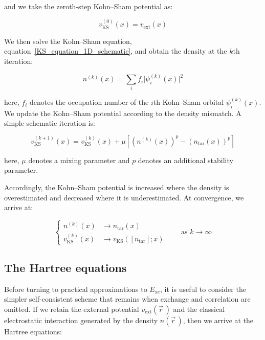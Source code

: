 and we take the zeroth-step Kohn--Sham potential as:

\begin{equation}
    v_\mathrm{KS}^{(0)}(x)=v_\mathrm{ext}(x)
\label{inverse_KS_initial_guess}
\end{equation}

We then solve the Kohn--Sham equation, equation~\eqref{KS_equation_1D_schematic}, and obtain the density at the $k$th iteration:

\begin{equation}
    n^{(k)}(x)=\sum_i f_i \lvert\psi_i^{(k)}(x)\rvert^2
\label{inverse_KS_density_from_kth_iteration}
\end{equation}

here, $f_i$ denotes the occupation number of the $i$th Kohn--Sham orbital $\psi_i^{(k)}(x)$.
We update the Kohn--Sham potential according to the density mismatch.
A simple schematic iteration is:

\begin{equation}
    v_\mathrm{KS}^{(k+1)}(x) = v_\mathrm{KS}^{(k)}(x)
    + \mu \left[\left(n^{(k)}(x)\right)^p - \left(n_\mathrm{tar}(x)\right)^p\right]
\label{inverse_KS_density_update}
\end{equation}

here, $\mu$ denotes a mixing parameter and $p$ denotes an additional stability parameter.

Accordingly, the Kohn--Sham potential is increased where the density is overestimated and decreased where it is underestimated.
At convergence, we arrive at:

\begin{equation}
\left\{
\begin{aligned}
    n^{(k)}(x)                &\rightarrow n_\mathrm{tar}(x)   \\
    v_\mathrm{KS}^{(k)}(x)    &\rightarrow v_\mathrm{KS}([n_\mathrm{tar}];x)
\end{aligned}\right.
\qquad
\text{as $k\rightarrow\infty$} 
\label{inverse_KS_fixed_point_condition}
\end{equation}

\subsection{The Hartree equations}

Before turning to practical approximations to $E_\mathrm{xc}$, it is useful to consider the simpler self-consistent scheme that remains when exchange and correlation are omitted. If we retain the external potential $v_\mathrm{ext}(\vec{r}\,)$ and the classical electrostatic interaction generated by the density $n(\vec{r}\,)$, then we arrive at the Hartree equations:

